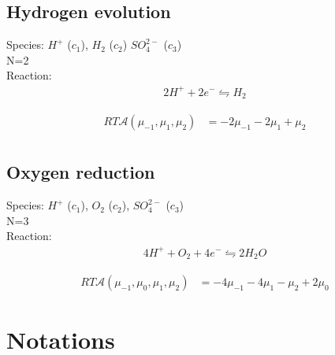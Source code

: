 \documentclass[12pt,oneside,reqno]{amsart}
\numberwithin{equation}{section}
\begin{document}
\subsection{Hydrogen evolution}
Species: $H^+$ ($c_1$), $H_2$ ($c_2$) $SO_4^{2-}$ ($c_3$)\\
N=2\\
Reaction:
\begin{align}
  2H^+ + 2e^- \leftrightharpoons  H_2
\end{align}

\begin{align}
  RT\mathcal A(\mu_{-1}, \mu_1,\mu_2)&=-2\mu_{-1}-2\mu_1+\mu_2\\
\end{align}



\subsection{Oxygen reduction}
Species: $H^+$ ($c_1$),  $O_2$ ($c_2$), $SO_4^{2-}$ ($c_3$)\\
N=3\\
Reaction:
\begin{align}
  4H^+ + O_2 + 4e^- \leftrightharpoons  2H_2O
\end{align}

\begin{align}
  RT \mathcal A(\mu_{-1}, \mu_0,\mu_1,\mu_2)&=-4\mu_{-1}-4\mu_1-\mu_2+2\mu_0
\end{align}



\clearpage




\appendix
\section{Notations}
\end{document}

